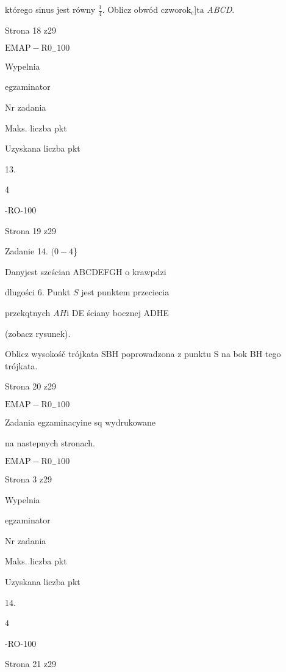 \documentclass[a4paper,12pt]{article}
\begin{document}
którego sinus jest równy $\displaystyle \frac{1}{4}$. Oblicz obwód $\mathrm{c}\mathrm{z}\mathrm{w}\mathrm{o}\mathrm{r}\mathrm{o}\mathrm{k}_{\mathrm{c}}$]$\mathrm{t}\mathrm{a}$ {\it ABCD}.

Strona 18 z29

$\mathrm{E}\mathrm{M}\mathrm{A}\mathrm{P}-\mathrm{R}0_{-}100$





Wypelnia

egzaminator

Nr zadania

Maks. liczba pkt

Uzyskana liczba pkt

13.

4

-RO-100

Strona 19 z29





Zadanie 14. $(0-4$\}

Danyjest sześcian ABCDEFGH o krawpdzi

dlugości 6. Punkt $S$ jest punktem przeciecia

przekqtnych $AH \mathrm{i}$ DE ściany bocznej ADHE

(zobacz rysunek).

Oblicz wysokośč trójkata SBH poprowadzona z punktu S na bok BH tego trójkata.

Strona 20 z29

$\mathrm{E}\mathrm{M}\mathrm{A}\mathrm{P}-\mathrm{R}0_{-}100$





Zadania egzaminacyine sq wydrukowane

na nastepnych stronach.

$\mathrm{E}\mathrm{M}\mathrm{A}\mathrm{P}-\mathrm{R}0_{-}100$

Strona 3 z29





Wypelnia

egzaminator

Nr zadania

Maks. liczba pkt

Uzyskana liczba pkt

14.

4

-RO-100

Strona 21 z29
\end{document}
